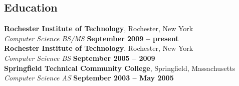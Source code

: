 \documentclass[margin,line]{resume}
\begin{document}
\begin{resume}
    \section{\mysidestyle Education}

    \textbf{Rochester Institute of Technology}, Rochester, New York \\\vspace{2mm}%
    \textsl{Computer Science BS/MS} \hfill \textbf{September 2009 -- present}\\\vspace{0.5mm}%
    \textbf{Rochester Institute of Technology}, Rochester, New York \\\vspace{2mm}%
    \textsl{Computer Science BS} \hfill \textbf{September 2005 -- 2009}\\\vspace{0.5mm}%
    \textbf{Springfield Technical Community College}, Springfield, Massachusetts \\\vspace{2mm}%
    \textsl{Computer Science AS} \hfill \textbf{September 2003 -- May 2005}\\\vspace{0.5mm}%


\end{resume}
\end{document}
